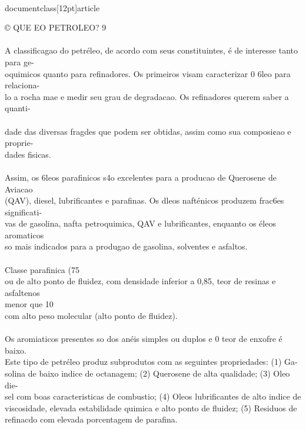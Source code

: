 \\documentclass[12pt]{article}
\begin{document}
{© QUE EO PETROLEO? 9\\
\\
A classificagao do petréleo, de acordo com seus constituintes, é de interesse tanto para ge-\\
oquimicos quanto para refinadores. Os primeiros visam caracterizar 0 6leo para relaciona-\\
lo a rocha mae e medir seu grau de degradacao. Os refinadores querem saber a quanti-\\
\\
dade das diversas fragdes que podem ser obtidas, assim como sua composi¢ao e proprie-\\
dades fisicas.\\
\\
Assim, os 6leos parafinicos s4o excelentes para a producao de Querosene de Aviacao\\
(QAV), diesel, lubrificantes e parafinas. Os dleos nafténicos produzem frac6es significati-\\
vas de gasolina, nafta petroquimica, QAV e lubrificantes, enquanto os éleos aromaticos\\
so mais indicados para a produgao de gasolina, solventes e asfaltos.\\
\\
Classe parafinica (75\\%
ou de alto ponto de fluidez, com densidade inferior a 0,85, teor de resinas e asfaltenos\\
menor que 10\\%
com alto peso molecular (alto ponto de fluidez).\\
\\
Os aromiaticos presentes so dos anéis simples ou duplos e 0 teor de enxofre é baixo.\\
Este tipo de petréleo produz subprodutos com as seguintes propriedades: (1) Ga-\\
solina de baixo indice de octanagem; (2) Querosene de alta qualidade; (3) Oleo die-\\
sel com boas caracteristicas de combustio; (4) Oleos lubrificantes de alto indice de\\
viscosidade, elevada estabilidade quimica e alto ponto de fluidez; (5) Residuos de\\
refinacdo com elevada porcentagem de parafina.\\
}
\end{document}
